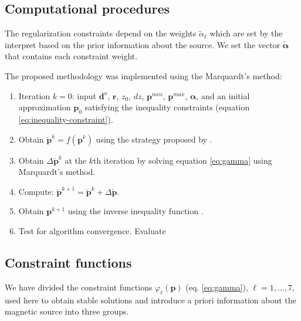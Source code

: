 \subsection{Computational procedures}

The regularization constraints depend on the weights $\tilde{\alpha}_\ell$ which are set by the interpret based on the prior information about the source. We set the vector $\tilde{\boldsymbol{\alpha}}$ that contains each constraint weight.

The proposed methodology was implemented using the Marquardt's method:

\begin{enumerate}
	\item Iteration $k = 0$: input $\mathbf{d}^o$, $\mathbf{r}$, $z_0$, $dz$, $\mathbf{p}^{min}$, $\mathbf{p}^{max}$, $\boldsymbol{\alpha}$, and an initial approximation $\mathbf{p}_0$ satisfying the inequality constraints (equation \ref{eq:inequality-constraint}).
	\item Obtain $\breve{\mathbf{p}}^k = f(\mathbf{p}^k)$ using the strategy proposed by \cite{barbosa-etal1999}.
	\item Obtain $\Delta\breve{\mathbf{p}}^k$ at the $k$th iteration by solving equation \ref{eq:gamma} using Marquardt’s method.
	\item Compute: $\breve{\mathbf{p}}^{k+1} = \breve{\mathbf{p}}^k + \Delta\breve{\mathbf{p}}$.
	\item Obtain $\mathbf{p}^{k+1}$ using the inverse inequality function \citet{barbosa-etal1999}.
	\item Test for algorithm convergence. Evaluate 
\end{enumerate}

\subsection{Constraint functions}

We have divided the constraint functions $\varphi_{\ell}(\mathbf{p})$ (eq. \ref{eq:gamma}), $\ell = 1, \dots, 7$, used here to 
obtain stable solutions and introduce a priori information about the magnetic source into three groups. 

